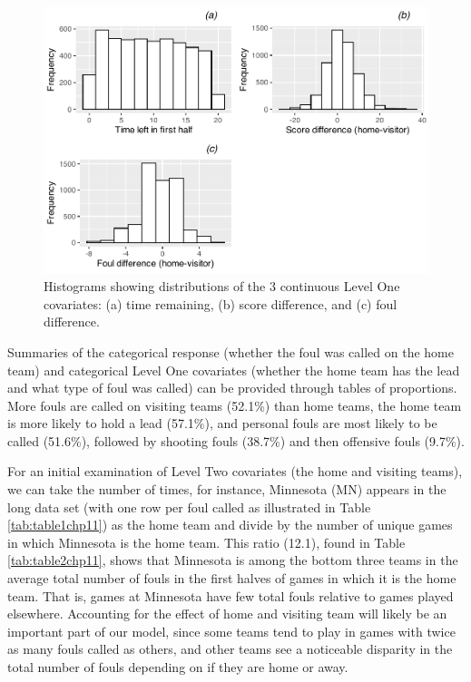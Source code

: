 \documentclass[
]{krantz}
\begin{document}
\begin{figure}

{\centering \includegraphics[width=0.6\linewidth]{bookdown-BeyondMLR_files/figure-latex/gmu-histmat1-1} 

}

\caption{Histograms showing distributions of the 3 continuous Level One covariates: (a) time remaining, (b) score difference, and (c) foul difference.}\label{fig:gmu-histmat1}
\end{figure}

Summaries of the categorical response (whether the foul was called on the home team) and categorical Level One covariates (whether the home team has the lead and what type of foul was called) can be provided through tables of proportions. More fouls are called on visiting teams (52.1\%) than home teams, the home team is more likely to hold a lead (57.1\%), and personal fouls are most likely to be called (51.6\%), followed by shooting fouls (38.7\%) and then offensive fouls (9.7\%).

For an initial examination of Level Two covariates (the home and visiting teams), we can take the number of times, for instance, Minnesota (MN) appears in the long data set (with one row per foul called as illustrated in Table \ref{tab:table1chp11}) as the home team and divide by the number of unique games in which Minnesota is the home team. This ratio (12.1), found in Table \ref{tab:table2chp11}, shows that Minnesota is among the bottom three teams in the average total number of fouls in the first halves of games in which it is the home team. That is, games at Minnesota have few total fouls relative to games played elsewhere. Accounting for the effect of home and visiting team will likely be an important part of our model, since some teams tend to play in games with twice as many fouls called as others, and other teams see a noticeable disparity in the total number of fouls depending on if they are home or away.
\end{document}

